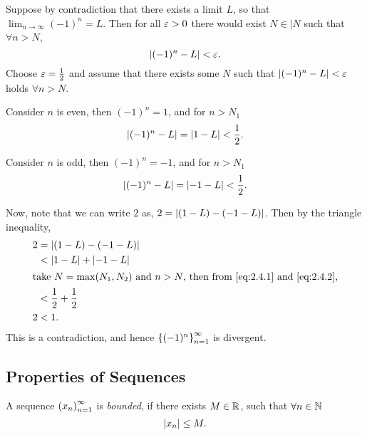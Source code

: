 \documentclass[12pt]{article}
\theoremstyle{definition}
\renewenvironment{proof}[1][\proofname]{\vspace{-10pt}\begin{replacementproof}}{\end{replacementproof}}
\begin{document}
    \begin{proof}
        Suppose by contradiction that there exists a limit $L$, so that $\lim_{n \rightarrow \infty}(-1)^{n} = L$. Then for all $\varepsilon > 0$ there would exist $N \in |N$ such that $\forall n > N$,
        \begin{equation*}
            \left|(-1)^{n} - L\right| < \varepsilon.
        \end{equation*}
        Choose $\varepsilon = \frac{1}{2}$ and assume that there exists some $N$ such that $\left|(-1)^{n} - L\right| < \varepsilon$ holds $\forall n > N$. 

        Consider $n$ is even, then $(-1)^n = 1$, and for $n > N_{1}$
        \begin{equation}
            \left|(-1)^{n} - L\right| = \left|1 - L\right| < \frac{1}{2}. \label{eq:2.4.1}
        \end{equation}

        Consider $n$ is odd, then $(-1)^{n} = - 1$, and for $n > N_{1}$
        \begin{equation}
            \left|(-1)^{n} - L\right| = \left|-1 - L\right| < \frac{1}{2}. \label{eq:2.4.2}
        \end{equation}

        Now, note that we can write $2$ as, $2 = \left|(1 - L) - (-1 - L)\right|$. Then by the triangle inequality,
        \begin{align*}
            2 &= \left|(1 - L) - (-1 - L)\right| \\
              &< \left|1 - L\right| + \left|-1 - L\right| \\
        \intertext{take $N = \max(N_{1}, N_{2})$ and $n > N$, then from \eqref{eq:2.4.1} and \eqref{eq:2.4.2},}
              &< \frac{1}{2} + \frac{1}{2} \\
            2 &< 1.
        \end{align*}
        This is a contradiction, and hence $\left\{(-1)^{n}\right\}_{n = 1}^{\infty}$ is divergent. 
    \end{proof}
    \subsection{Properties of Sequences}
    \begin{definition}[Boundedness]
        A sequence $\left(x_{n}\right)_{n = 1}^{\infty}$ is \textit{bounded}, if there exists $M \in \R$, such that $\forall n \in \mathbb{N}$
        \begin{equation}
            \left|x_{n}\right| \leq M.
        \end{equation}
    \end{definition}
\end{document}
